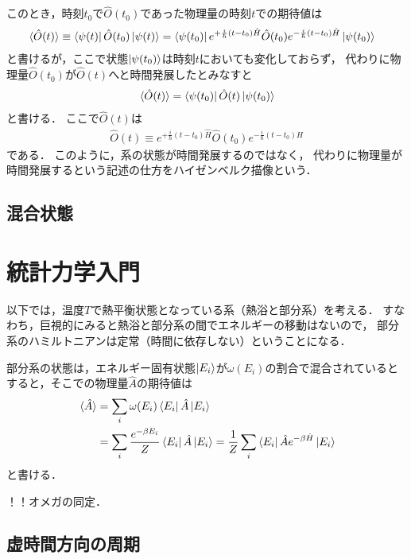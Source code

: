 \documentclass[uplatex,dvipdfmx]{vkaishi}
\begin{document}
このとき，時刻$t_0$で$\hat O(t_0)$であった物理量の時刻$t$での期待値は
\begin{align}
  \expval*{\hat O(t)}
    \equiv \bra{\psi(t)} \hat O(t_0) \ket{\psi(t)}
    &= \bra{\psi(t_0)} e^{+ \frac{i}{\hbar} (t - t_0) \hat H} \hat O(t_0) e^{- \frac{i}{\hbar} (t - t_0) \hat H} \ket{\psi(t_0)}
\end{align}
と書けるが，ここで状態$\ket{\psi(t_0)}$は時刻$t$においても変化しておらず，
代わりに物理量$\hat O(t_0)$が$\hat O(t)$へと時間発展したとみなすと
\begin{align}
  \expval*{\hat O(t)}
  = \bra{\psi(t_0)} \hat O(t) \ket{\psi(t_0)}
\end{align}
と書ける．
ここで$\hat O(t)$は
\begin{align}
  \hat O(t) \equiv e^{+ \frac{i}{\hbar} (t - t_0) \hat H} \hat O(t_0) e^{- \frac{i}{\hbar} (t - t_0) \hat H}
\end{align}
である．
このように，系の状態が時間発展するのではなく，
代わりに物理量が時間発展するという記述の仕方をハイゼンベルク描像という．

\subsection{混合状態}



\section{統計力学入門}

以下では，温度$T$で熱平衡状態となっている系（熱浴と部分系）を考える．
すなわち，巨視的にみると熱浴と部分系の間でエネルギーの移動はないので，
部分系のハミルトニアンは定常（時間に依存しない）ということになる．

部分系の状態は，エネルギー固有状態$\ket{E_i}$が$\omega(E_i)$の割合で混合されているとすると，そこでの物理量$\hat A$の期待値は
\begin{align}
  \expval*{\hat A}
  &= \sum_i \omega(E_i) \bra{E_i} \hat A \ket{E_i} \\
  &= \sum_i \frac{e^{-\beta E_i}}{Z} \bra{E_i} \hat A \ket{E_i}
  = \frac1Z \sum_i \bra{E_i} \hat A e^{-\beta \hat H} \ket{E_i}
\end{align}
と書ける．

！！オメガの同定．

\subsection{虚時間方向の周期}
\end{document}
